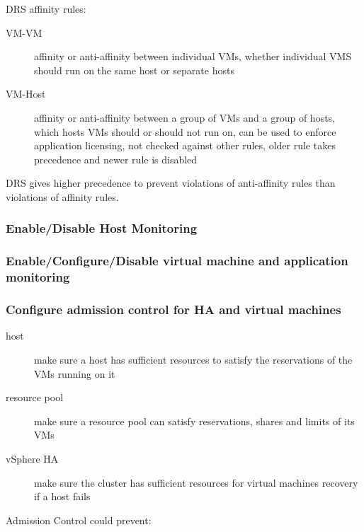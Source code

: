 DRS affinity rules:

\begin{description}

\item[VM-VM]
affinity or anti-affinity between individual VMs, whether individual VMS
should run on the same host or separate hosts

\item[VM-Host]
affinity or anti-affinity between a group of VMs and a group of hosts,
which hosts VMs should or should not run on, can be used to enforce
application licensing, not checked against other rules, older rule takes
precedence and newer rule is disabled

\end{description}

DRS gives higher precedence to prevent violations of anti-affinity rules than
violations of affinity rules.

\subsubsection{Enable/Disable Host Monitoring}

\subsubsection{Enable/Configure/Disable virtual machine and application monitoring}

\subsubsection{Configure admission control for HA and virtual machines}

\begin{description}

\item[host]
make sure a host has sufficient resources to satisfy the reservations of the
VMs running on it

\item[resource pool]
make sure a resource pool can satisfy reservations, shares and limits of its
VMs

\item[vSphere HA]
make sure the cluster has sufficient resources for virtual machines recovery
if a host fails

\end{description}

Admission Control could prevent:

